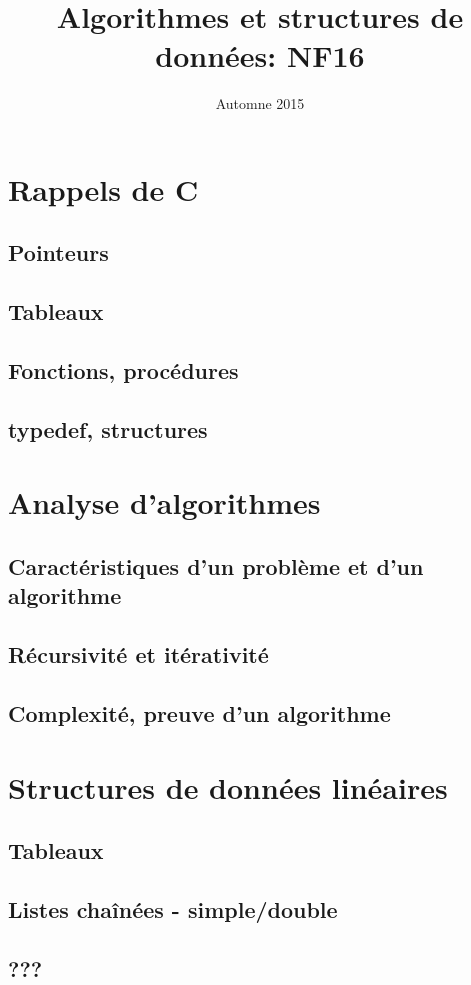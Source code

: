 \documentclass{report}
\title{Algorithmes et structures de données: \textbf{NF16}}
\date{Automne 2015}
\begin{document}
\maketitle{}

\tableofcontents

\chapter{Rappels de C}
\section{Pointeurs}
\section{Tableaux}
\section{Fonctions, procédures}
\section{typedef, structures}

\chapter{Analyse d'algorithmes}
\section{Caractéristiques d'un problème et d'un algorithme}
\section{Récursivité et itérativité}
\section{Complexité, preuve d'un algorithme}

\chapter{Structures de données linéaires}
\section{Tableaux}
\section{Listes chaînées - simple/double}
\section{???}
\end{document}
